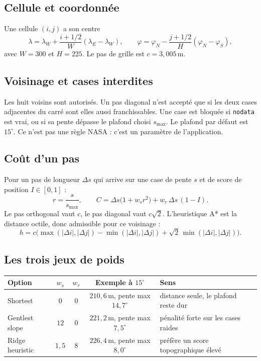 \documentclass[11pt,a4paper]{article}
\begin{document}
\subsection{Cellule et coordonnée}

Une cellule \((i,j)\) a son centre
\[
\lambda = \lambda_W + \frac{i+1/2}{W}(\lambda_E-\lambda_W),
\qquad
\varphi = \varphi_N - \frac{j+1/2}{H}(\varphi_N-\varphi_S),
\]
avec \(W=300\) et \(H=225\). Le pas de grille est \(c=3{,}005\,\mathrm{m}\).

\subsection{Voisinage et cases interdites}

Les huit voisins sont autorisés. Un pas diagonal n'est accepté que si les deux cases
adjacentes du carré sont elles aussi franchissables. Une case est bloquée si
\texttt{nodata} est vrai, ou si sa pente dépasse le plafond choisi \(s_{\max}\).
Le plafond par défaut est \(15^\circ\). Ce n'est pas une règle NASA : c'est un paramètre de l'application.

\subsection{Coût d'un pas}

Pour un pas de longueur \(\Delta s\) qui arrive sur une case de pente \(s\) et de score
de position \(I\in[0,1]\) :
\[
r=\frac{s}{s_{\max}},
\qquad
C=\Delta s\bigl(1+w_s r^2\bigr)+w_r\,\Delta s\,(1-I).
\]
Le pas orthogonal vaut \(c\), le pas diagonal vaut \(c\sqrt{2}\).
L'heuristique A* est la distance octile, donc admissible pour ce voisinage :
\[
h=c\bigl(\max(|\Delta i|,|\Delta j|)-\min(|\Delta i|,|\Delta j|)
+\sqrt{2}\,\min(|\Delta i|,|\Delta j|)\bigr).
\]

\subsection{Les trois jeux de poids}

\begin{center}
\begin{tabular}{@{}lcccl@{}}
\toprule
Option & \(w_s\) & \(w_r\) & Exemple à \(15^\circ\) & Sens \\
\midrule
Shortest & \(0\) & \(0\) & \(210{,}6\,\mathrm{m}\), pente max \(14{,}7^\circ\) &
distance seule, le plafond reste dur \\
Gentlest slope & \(12\) & \(0\) & \(221{,}2\,\mathrm{m}\), pente max \(7{,}5^\circ\) &
pénalité forte sur les cases raides \\
Ridge heuristic & \(1{,}5\) & \(8\) & \(226{,}4\,\mathrm{m}\), pente max \(8{,}0^\circ\) &
préfère un score topographique élevé \\
\bottomrule
\end{tabular}
\end{center}
\end{document}
